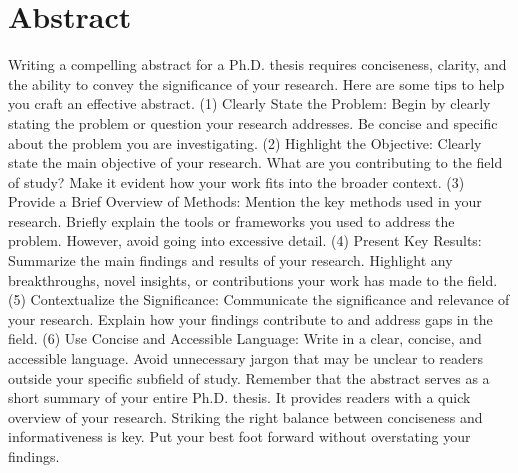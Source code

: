 
\chapter*{Abstract}


Writing a compelling abstract for a Ph.D. thesis requires conciseness, clarity, and the ability to convey the significance of your research. Here are some tips to help you craft an effective abstract.
(1) Clearly State the Problem:
Begin by clearly stating the problem or question your research addresses.
Be concise and specific about the problem you are investigating.
(2) Highlight the Objective:
Clearly state the main objective of your research.
What are you contributing to the field of study?
Make it evident how your work fits into the broader context.
(3) Provide a Brief Overview of Methods:
Mention the key methods used in your research.
Briefly explain the tools or frameworks you used to address the problem.
However, avoid going into excessive detail.
(4) Present Key Results:
Summarize the main findings and results of your research. 
Highlight any breakthroughs, novel insights, or contributions your work has made to the field.
(5) Contextualize the Significance:
Communicate the significance and relevance of your research. 
Explain how your findings contribute to and address gaps in the field.
(6) Use Concise and Accessible Language:
Write in a clear, concise, and accessible language.
Avoid unnecessary jargon that may be unclear to readers outside your specific subfield of study.
Remember that the abstract serves as a short summary of your entire Ph.D. thesis.
It provides readers with a quick overview of your research. Striking the right balance between conciseness and informativeness is key.
Put your best foot forward without overstating your findings.




